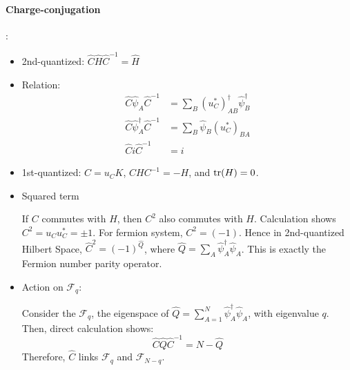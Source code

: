 \documentclass{article}
\begin{document}
\paragraph{Charge-conjugation}:
\begin{itemize}
    \item 2nd-quantized: 
        $\hat{C}\hat{H}\hat{C}^{-1}=\hat{H}$ 
    \item Relation:
    \begin{align}
        \hat{C} \hat\psi_A \hat{C}^{-1} &=
        \sum_B (u_C^*)^\dagger_{AB} \hat\psi^\dagger_B \\
        \hat{C} \hat\psi^\dagger_A \hat{C}^{-1} &= 
        \sum_B  \hat\psi_B (u_C^*)_{BA} \\
        \hat{C}i\hat{C}^{-1} &= i
    \end{align}
    \item 1st-quantized:
        $C=u_C K$, $CHC^{-1}=-H$, and $\tr(H)=0$.
    \item Squared term
        
        If $C$ commutes with $H$, then $C^2$ also
        commutes with $H$. Calculation shows $C^2= u_Cu_C^* = \pm 1$.
        For fermion system, $C^2=(-1)$. Hence in 2nd-quantized Hilbert
        Space, $\hat{C}^2=(-1)^{\hat{Q}}$, where $\hat{Q}=\sum_A
        \hat\psi^\dagger_A \hat\psi_A$. This is exactly the Fermion
        number parity operator.

    \item Action on $\mathcal{F}_q$:

        Consider the $\mathcal{F}_q$, the eigenspace of
        $\hat{Q}=\sum_{A=1}^N \hat\psi^\dagger_A \hat\psi_A$, with
        eigenvalue $q$. Then, direct calculation shows:
        \begin{equation}
            \hat{C}\hat{Q}\hat{C}^{-1} = N -\hat{Q}
        \end{equation}
        Therefore, $\hat{C}$ links $\mathcal{F}_q$ and
        $\mathcal{F}_{N-q}$.
\end{itemize}
\end{document}
